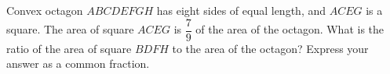 Convex octagon $ABCDEFGH$ has eight sides of equal length, and $ACEG$ is a square. The area of square $ACEG$ is $\dfrac{7}{9}$ of the area of the octagon. What is the ratio of the area of square $BDFH$ to the area of the octagon? Express your answer as a common fraction.
